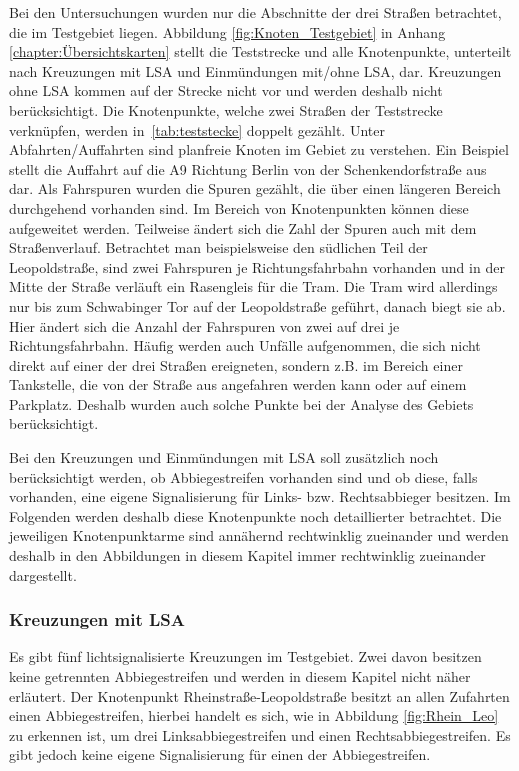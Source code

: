 Bei den Untersuchungen wurden nur die Abschnitte der drei Straßen betrachtet, die im Testgebiet liegen. Abbildung \ref{fig:Knoten_Testgebiet} in Anhang \ref{chapter:Übersichtskarten} stellt die Teststrecke und alle Knotenpunkte, unterteilt nach Kreuzungen mit LSA und Einmündungen mit/ohne LSA, dar. Kreuzungen ohne LSA kommen auf der Strecke nicht vor und werden deshalb nicht berücksichtigt. Die Knotenpunkte, welche zwei Straßen der Teststrecke verknüpfen, werden in~\autoref{tab:teststecke} doppelt gezählt. Unter Abfahrten/Auffahrten sind planfreie Knoten im Gebiet zu verstehen. Ein Beispiel stellt die Auffahrt auf die A9 Richtung Berlin von der Schenkendorfstraße aus dar. Als Fahrspuren wurden die Spuren gezählt, die über einen längeren Bereich durchgehend vorhanden sind. Im Bereich von Knotenpunkten können diese aufgeweitet werden. Teilweise ändert sich die Zahl der Spuren auch mit dem Straßenverlauf. Betrachtet man beispielsweise den südlichen Teil der Leopoldstraße, sind zwei Fahrspuren je Richtungsfahrbahn vorhanden und in der Mitte der Straße verläuft ein Rasengleis für die Tram. Die Tram wird allerdings nur bis zum Schwabinger Tor auf der Leopoldstraße geführt, danach biegt sie ab. Hier ändert sich die Anzahl der Fahrspuren von zwei auf drei je Richtungsfahrbahn. Häufig werden auch Unfälle aufgenommen, die sich nicht direkt auf einer der drei Straßen ereigneten, sondern z.B. im Bereich einer Tankstelle, die von der Straße aus angefahren werden kann oder auf einem Parkplatz. Deshalb wurden auch solche Punkte bei der Analyse des Gebiets berücksichtigt.

Bei den Kreuzungen und Einmündungen mit LSA soll zusätzlich noch berücksichtigt werden, ob Abbiegestreifen vorhanden sind und ob diese, falls vorhanden, eine eigene Signalisierung für Links- bzw. Rechtsabbieger besitzen. Im Folgenden werden deshalb diese Knotenpunkte noch detaillierter betrachtet. Die jeweiligen Knotenpunktarme sind annähernd rechtwinklig zueinander und werden deshalb in den Abbildungen in diesem Kapitel immer rechtwinklig zueinander dargestellt.

\subsubsection{Kreuzungen mit LSA}
Es gibt fünf lichtsignalisierte Kreuzungen im Testgebiet. Zwei davon besitzen keine getrennten Abbiegestreifen und werden in diesem Kapitel nicht näher erläutert. Der Knotenpunkt Rheinstraße-Leopoldstraße besitzt an allen Zufahrten einen Abbiegestreifen, hierbei handelt es sich, wie in Abbildung \ref{fig:Rhein_Leo} zu erkennen ist, um drei Linksabbiegestreifen und einen Rechtsabbiegestreifen. Es gibt jedoch keine eigene Signalisierung für einen der Abbiegestreifen. 

